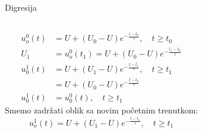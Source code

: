 \begin{frame}[label=08-s060]{Digresija}
\setlength{\parskip}{2pt}
\setlength{\abovedisplayskip}{4pt}\setlength{\belowdisplayskip}{4pt}
\begin{columns}[c,onlytextwidth]
\centering\par\medskip

\begin{align*}
u_o^0(t)&=U+(U_0-U)e^{-\frac{t-t_0}{\tau}},\quad t\geq t_0\\
U_1&=u_o^0(t_1)=U+(U_0-U)e^{-\frac{t_1-t_0}{\tau}}\\
u_0^1(t)&=U+(U_1-U)e^{-\frac{t-t_1}{\tau}},\quad t\geq t_1\\
&=U+(U_0-U)e^{-\frac{t-t_0}{\tau}}\\
u_0^1(t)&=u_0^0(t),\quad t\geq t_1
\end{align*}
Smemo zadržati oblik sa novim početnim trenutkom:
\[u_o^1(t)=U+(U_1-U)e^{-\frac{t-t_1}{\tau}},\quad t\geq t_1\]
\end{columns}
\end{frame}
